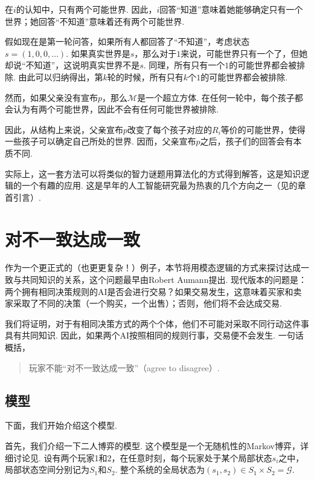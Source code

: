 在$i$的认知中，只有两个可能世界. 因此，$i$回答“知道”意味着她能够确定只有一个世界；她回答“不知道”意味着还有两个可能世界. 

假如现在是第一轮问答，如果所有人都回答了“不知道”，考虑状态$s=(1,0,0,\dots)$. 如果真实世界是$s$，那么对于$1$来说，可能世界只有一个了，但她却说“不知道”，这说明真实世界不是$s$. 同理，所有只有一个$1$的可能世界都会被排除. 由此可以归纳得出，第$k$轮的时候，所有只有$k$个$1$的可能世界都会被排除. 

然而，如果父亲没有宣布$p$，那么$\mathcal{M}$是一个超立方体. 在任何一轮中，每个孩子都会认为有两个可能世界，因此不会有任何可能世界被排除. 

因此，从结构上来说，父亲宣布$p$改变了每个孩子对应的$R_i$等价的可能世界，使得一些孩子可以确定自己所处的世界. 因而，父亲宣布$p$之后，孩子们的回答会有本质不同. 

实际上，这一套方法可以将类似的智力谜题用算法化的方式得到解答，这是知识逻辑的一个有趣的应用. 这是早年的人工智能研究最为热衷的几个方向之一（见的章首引言）. 

\section{对不一致达成一致}

作为一个更正式的（也更更复杂！）例子，本节将用模态逻辑的方式来探讨达成一致与共同知识的关系，这个问题最早由Robert Aumann提出. 现代版本的问题是：两个拥有相同决策规则的AI是否会进行交易？如果交易发生，这意味着买家和卖家采取了不同的决策（一个购买，一个出售）；否则，他们将不会达成交易. 

我们将证明，对于有相同决策方式的两个个体，他们不可能对采取不同行动这件事具有共同知识. 因此，如果两个AI按照相同的规则行事，交易便不会发生. 一句话概括，\
\begin{quotation}
    玩家不能“对不一致达成一致”（agree to disagree）. 
\end{quotation}

\subsection{模型}

下面，我们开始介绍这个模型. 

首先，我们介绍一下二人博弈的模型. 这个模型是一个无随机性的Markov博弈，详细讨论见. 设有两个玩家1和2，在任意时刻，每个玩家处于某个局部状态$s_i$之中，局部状态空间分别记为$S_1$和$S_2$. 整个系统的全局状态为$(s_1, s_2) \in S_1 \times S_2 = \mathcal{G}$. 

